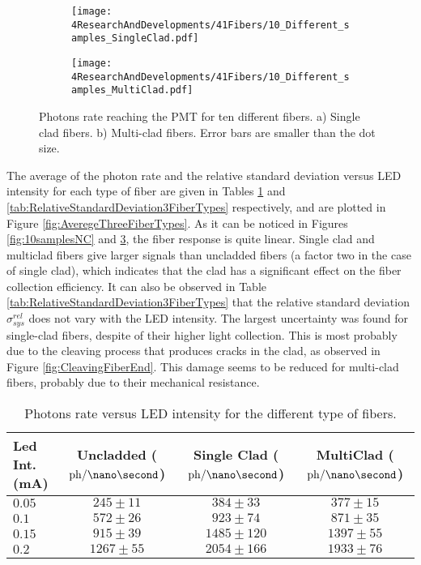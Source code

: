 \begin{figure}
\centering
    \begin{subfigure}[b]{1\textwidth}
    \centering
    \texttt{[image: 4ResearchAndDevelopments/41Fibers/10\_Different\_samples\_SingleClad.pdf]}  
    \caption{\label{subfig:10samplesSC}}
    \end{subfigure}
    \hfill
    \begin{subfigure}[b]{1\textwidth}
    \centering
    \texttt{[image: 4ResearchAndDevelopments/41Fibers/10\_Different\_samples\_MultiClad.pdf]}  
    \caption{\label{subfig:10samplesMC}}
    \end{subfigure}
 \caption{Photons rate reaching the PMT for ten different fibers. a) Single clad fibers. b) Multi-clad fibers. Error bars are smaller than the dot size.}
 \label{fig:10samplesThreeTypes}
\end{figure}
The average of the photon rate and the relative standard deviation versus LED intensity for each type of fiber are given in Tables \ref{tab:10DifferentSamples} and \ref{tab:RelativeStandardDeviation3FiberTypes} respectively, and are plotted in Figure \ref{fig:AveregeThreeFiberTypes}. As it can be noticed in Figures \ref{fig:10samplesNC} and \ref{fig:10samplesThreeTypes}, the fiber response is quite linear. Single clad and multiclad fibers give larger signals than uncladded fibers (a factor two in the case of single clad), which indicates that the clad has a significant effect on the fiber collection efficiency. It can also be observed in Table \ref{tab:RelativeStandardDeviation3FiberTypes} that the relative standard deviation $\sigma^{rel}_{sys}$ does not vary with the LED intensity. The largest uncertainty was found for single-clad fibers, despite of their higher light collection. This is most probably due to the cleaving process that produces cracks in the clad, as observed in Figure \ref{fig:CleavingFiberEnd}. This damage seems to be reduced for multi-clad fibers, probably due to their mechanical resistance.

\begin{table}[h]
\centering{}%
\begin{tabular}{lccc}
\toprule 
Led Int. (mA) & Uncladded ($\text{ph}/\nano\second$) & Single Clad ($\text{ph}/\nano\second$) & MultiClad ($\text{ph}/\nano\second$) \tabularnewline
\midrule
\midrule 
$0.05$ & $245 \pm 11$ & $384 \pm 33$ & $377 \pm 15$ \tabularnewline
$0.1$ & $572 \pm 26$ & $923 \pm 74$ & $871 \pm 35$ \tabularnewline
$0.15$ & $915 \pm 39$ & $1485 \pm 120$ & $1397 \pm 55$ \tabularnewline
$0.2$ & $1267 \pm 55$ & $2054 \pm 166$ & $1933 \pm 76$ \tabularnewline
\bottomrule
\end{tabular}
\caption{Photons rate versus LED intensity for the different type of fibers.}
\label{tab:10DifferentSamples}
\end{table}

